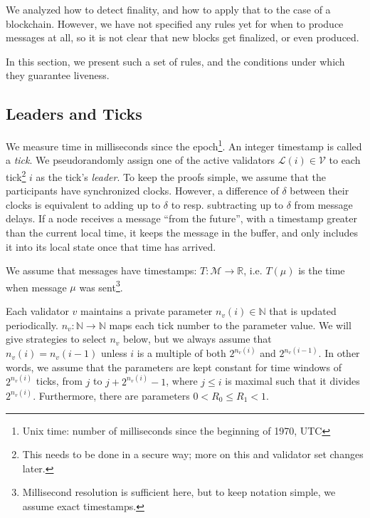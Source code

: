 \documentclass[12pt]{article}
\begin{document}
We analyzed how to detect finality, and how to apply that to the case of a blockchain. However, we have not specified any rules yet for when to produce messages at all, so it is not clear that new blocks get finalized, or even produced.

In this section, we present such a set of rules, and the conditions under which they guarantee liveness.


\subsection{Leaders and Ticks}

We measure time in milliseconds since the epoch\footnote{Unix time: number of milliseconds since the beginning of 1970, UTC}. An integer timestamp is called a \emph{tick}. We pseudorandomly assign one of the active validators $\mathcal{L}(i) \in \mathcal{V}$ to each tick\footnote{This needs to be done in a secure way; more on this and validator set changes later.} $i$ as the tick's \emph{leader}. To keep the proofs simple, we assume that the participants have synchronized clocks. However, a difference of $\delta$ between their clocks is equivalent to adding up to $\delta$ to resp. subtracting up to $\delta$ from message delays. If a node receives a message ``from the future'', with a timestamp greater than the current local time, it keeps the message in the buffer, and only includes it into its local state once that time has arrived.

We assume that messages have timestamps: $T: \mathcal{M} \rightarrow \mathbb{R}$, i.e. $T(\mu)$ is the time when message $\mu$ was sent\footnote{Millisecond resolution is sufficient here, but to keep notation simple, we assume exact timestamps.}.

Each validator $v$ maintains a private parameter $n_v(i) \in \mathbb{N}$ that is updated periodically. $n_v: \mathbb{N} \rightarrow \mathbb{N}$ maps each tick number to the parameter value. We will give strategies to select $n_v$ below, but we always assume that $n_v (i) = n_v (i - 1)$ unless $i$ is a multiple of both $2^{n_v(i)}$ and $2^{n_v(i-1)}$. In other words, we assume that the parameters are kept constant for time windows of $2^{n_v(i)}$ ticks, from $j$ to $j + 2^{n_v(i)} - 1$, where $j \leq i$ is maximal such that it divides $2^{n_v(i)}$. Furthermore, there are parameters $0 < R_0 \leq R_1 < 1$.
\end{document}
